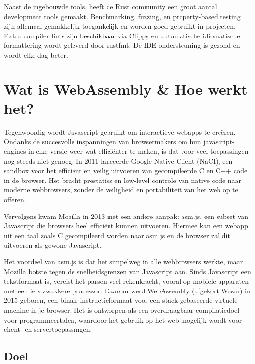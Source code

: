 Naast de ingebouwde tools, heeft de Rust community een groot aantal development tools gemaakt.
Benchmarking, fuzzing, en property-based testing zijn allemaal gemakkelijk toegankelijk en worden
goed gebruikt in projecten. Extra compiler lints zijn beschikbaar via Clippy en automatische
idiomatische formattering wordt geleverd door rustfmt. De IDE-ondersteuning is gezond en wordt elke
dag beter.

\clearpage

\section{Wat is WebAssembly \& Hoe werkt het?}

Tegenwoordig wordt Javascript gebruikt om interactieve webapps te creëren. Ondanks de succesvolle
inspanningen van browsermakers om hun javascript-engines in elke versie weer wat efficiënter te
maken, is dat voor veel toepassingen nog steeds niet genoeg. In 2011 lanceerde Google Native Client
(NaCI), een sandbox voor het efficiënt en veilig uitvoeren van gecompileerde C en C++ code in de
browser. Het bracht prestaties en low-level controle van native code naar moderne webbrowsers,
zonder de veiligheid en portabiliteit van het web op te offeren. \cite{native_client}

Vervolgens kwam Mozilla in 2013 met een andere aanpak: asm.js, een subset van Javascript die
browsers heel efficiënt kunnen uitvoeren. Hiermee kan een webapp uit een taal zoals C gecompileerd
worden naar asm.js en de browser zal dit uitvoeren als gewone Javascript.

Het voordeel van asm.js is dat het simpelweg in alle webbrowsers werkte, maar Mozilla botste tegen
de snelheidsgrenzen van Javascript aan. Sinds Javascript een tekstformaat is, vereist het parsen
veel rekenkracht, vooral op mobiele apparaten met een iets zwakkere processor. Daarom werd
WebAssembly (afgekort Wasm) in 2015 geboren, een binair instructieformaat voor een stack-gebaseerde
virtuele machine in je browser. Het is ontworpen als een overdraagbaar compilatiedoel voor
programmeertalen, waardoor het gebruik op het web mogelijk wordt voor client- en servertoepassingen.
\cite{wat_is_wasm}

\subsection{Doel}

